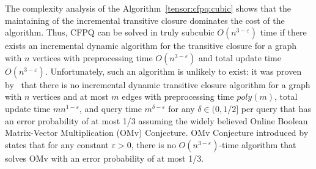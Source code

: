 The complexity analysis of the Algorithm~\ref{tensor:cfpq:cubic} shows that the maintaining of the incremental transitive closure dominates the cost of the algorithm. Thus, CFPQ can be solved in truly subcubic $O(n^{3-\varepsilon})$ time if there exists an incremental dynamic algorithm for the transitive closure for a graph with $n$ vertices with preprocessing time $O(n^{3-\varepsilon})$ and total update time $O(n^{3-\varepsilon})$. Unfortunately, such an algorithm is unlikely to exist: it was proven by~\cite{10.1145/2746539.2746609} that there is no incremental dynamic transitive closure algorithm for a graph with $n$ vertices and at most $m$ edges with preprocessing time $poly(m)$, total update time $mn^{1-\varepsilon}$, and query time $m^{\delta-\varepsilon}$ for any $\delta \in (0, 1/2]$ per query that has an error probability of at most 1/3 assuming the widely believed Online Boolean Matrix-Vector Multiplication (OMv) Conjecture. OMv Conjecture introduced by~\cite{10.1145/2746539.2746609} states that for any constant $ \varepsilon>0$, there is no $O(n^{3-\varepsilon})$-time algorithm that solves OMv with an error probability of at most 1/3.



